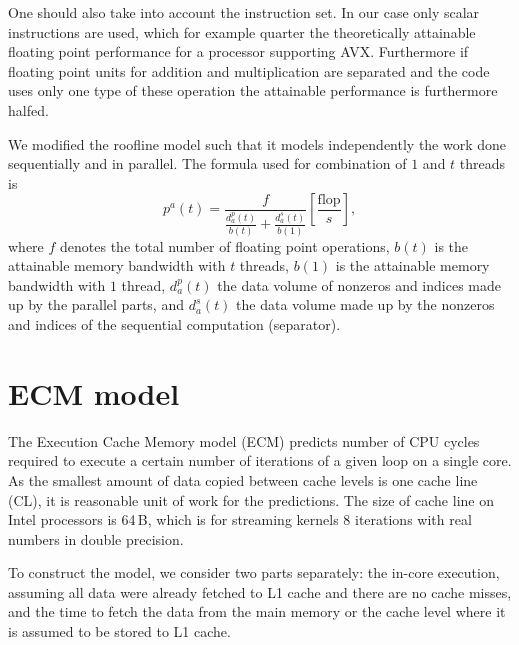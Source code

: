 One should also take into account the instruction set.
In our case only scalar instructions are used, which for example quarter the
theoretically attainable floating point performance for a processor supporting
AVX.
Furthermore if floating point units for addition and multiplication are
separated and the code uses only one type of these operation the attainable
performance is furthermore halfed.

We modified the roofline model such that it models independently the work done sequentially and in parallel.
The formula used for combination of $1$ and $t$ threads is
%
\begin{equation}
  p^{a}(t) 
  = \frac{
      f
    }{
     \frac{d_a^p(t) }{  b(t) } + \frac{ d_a^s(t) }{ b(1) }
    } \left[ \frac{\text{flop}}{s} \right],
\end{equation}
%
where $f$ denotes the total number of floating point operations,
$b(t)$ is the attainable memory bandwidth with $t$ threads,
$b(1)$ is the attainable memory bandwidth with $1$ thread,
$d_a^p(t)$ the data volume of nonzeros and indices made up by the parallel 
parts, and $d_a^s(t)$ the data volume made up by the nonzeros and indices of the
sequential computation (separator).



\section{ECM model}

\noindent
{}

The Execution Cache Memory model (ECM) predicts number of CPU cycles required to execute a certain number of iterations of a given loop on a single core. As the smallest amount of data copied between cache levels is one cache line (CL), it is reasonable unit of work for the predictions. The size of cache line on Intel processors is 64\,B, which is for streaming kernels 8 iterations with real numbers in double precision.

To construct the model, we consider two parts separately: the in-core execution, assuming all data were already fetched to L1 cache and there are no cache misses, and the time to fetch the data from the main memory or the cache level where it is assumed to be stored to L1 cache.

